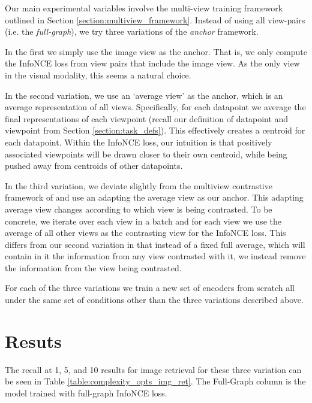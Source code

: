 Our main experimental variables involve the multi-view training framework outlined in Section \ref{section:multiview_framework}.
Instead of using all view-pairs (i.e. the \textit{full-graph}), we try three variations of the \textit{anchor} framework.

In the first we simply use the image view as the anchor.
That is, we only compute the InfoNCE loss from view pairs that include the image view.
As the only view in the visual modality, this seems a natural choice.

In the second variation, we use an `average view' as the anchor, which is an average representation of all views.
Specifically, for each datapoint we average the final representations of each viewpoint (recall our definition of datapoint and viewpoint from Section \ref{section:task_defs}).
This effectively creates a centroid for each datapoint. %
Within the InfoNCE loss, our intuition is that positively associated viewpoints will be drawn closer to their own centroid, while being pushed away from centroids of other datapoints.

In the third variation, we deviate slightly from the multiview contrastive framework of \cite{tian2020contrastive} and use an adapting the average view as our anchor.
This adapting average view changes according to which view is being contrasted.
To be concrete, we iterate over each view in a batch and for each view we use the average of all other views as the contrasting view for the InfoNCE loss.
This differs from our second variation in that instead of a fixed full average, which will contain in it the information from any view contrasted with it, we instead remove the information from the view being contrasted.

For each of the three variations we train a new set of encoders from scratch all under the same set of conditions other than the three variations described above.

\section{Resuts}
\label{section:loss_comp_results}
The recall at 1, 5, and 10 results for image retrieval for these three variation can be seen in Table \ref{table:complexity_opts_img_ret}.
The Full-Graph column is the model trained with full-graph InfoNCE loss.


